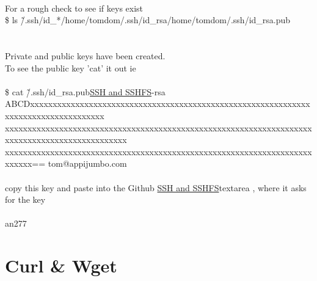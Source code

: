 \documentclass[10pt,a4paper]{article}
\begin{document}
{\\
For a rough check to see if keys exist\\
\$ ls \~/.ssh/id\_*}{\large /home/tomdom/.ssh/id\_rsa}{\large /home/tomdom/.ssh/id\_rsa.pub}{\large \\
\\
\\
Private and public keys have been created. \\
To see the public key 'cat' it out ie\\
\\
\$ cat \~/.ssh/id\_rsa.pub}{\large \hyperlink{ssh___and_sshfs}{SSH   and SSHFS}}{\large -rsa ABCDxxxxxxxxxxxxxxxxxxxxxxxxxxxxxxxxxxxxxxxxxxxxxxxxxxxxxxxxxxxxxxxxxxxxxxxxxxxxxxxxxxxx\\
xxxxxxxxxxxxxxxxxxxxxxxxxxxxxxxxxxxxxxxxxxxxxxxxxxxxxxxxxxxxxxxxxxxxxxxxxxxxxxxxxxxxxxxxxxxxxxx\\
xxxxxxxxxxxxxxxxxxxxxxxxxxxxxxxxxxxxxxxxxxxxxxxxxxxxxxxxxxxxxxxxxxxxxxxxxx== tom@appijumbo.com}{\large \\
\\
copy this key and paste into the Github \hyperlink{ssh___and_sshfs}{SSH   and SSHFS}}{\large  textarea , where it asks for the key}\\
\\
an277
\hypertarget{curl_\&_wget}{\section {Curl & Wget}}
\end{document}
